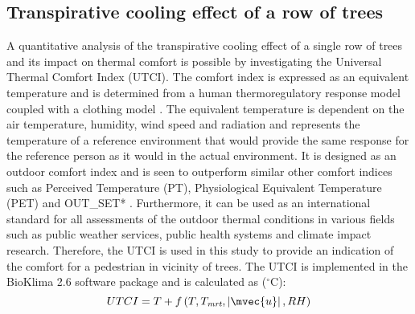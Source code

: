 \subsection{Transpirative cooling effect of a row of trees}

A quantitative analysis of the transpirative cooling effect of a single row of trees and its impact on thermal comfort is possible by investigating the Universal Thermal Comfort Index (UTCI). The comfort index is expressed as an equivalent temperature and is determined from a human thermoregulatory response model coupled with a clothing model \citep{Fiala2001}. The equivalent temperature is dependent on the air temperature, humidity, wind speed and radiation and represents the temperature of a reference environment that would provide the same response for the reference person as it would in the actual environment. It is designed as an outdoor comfort index and is seen to outperform similar other comfort indices such as Perceived Temperature (PT), Physiological Equivalent Temperature (PET) and OUT\_SET* \citep{Jendritzky2012}. Furthermore, it can be used as an international standard for all assessments of the outdoor thermal conditions in various fields such as public weather services, public health systems and climate impact research. Therefore, the UTCI is used in this study to provide an indication of the comfort for a pedestrian in vicinity of trees. The UTCI is implemented in the BioKlima 2.6 software package and is calculated as ($^{\circ}$C):
\begin{equation}
UTCI = T + f \left(T,{T_{\textit{mrt}}},\left| \mvec{u}  \right|,RH\right)
\label{eq:UTCI}
\end{equation}
